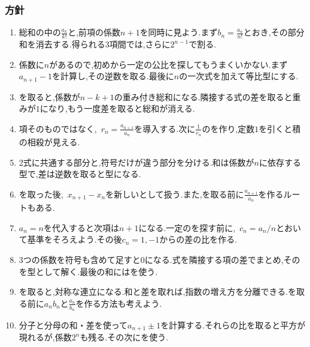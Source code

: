       \subsubsection{方針}\label{節：応用難易度：方針}\label{節：高難易度のもの：方針}
        \begin{enumerate}[label=\textbf{問\arabic*.},leftmargin=3.8em,format=\bookitemlink{practice-advanced}{hint}{problem}]
          \item 総和の中の$\displaystyle \frac{a_k}{k!}$と,前項の係数$n+1$を同時に見よう.まず$\displaystyle b_n=\frac{a_n}{n!}$とおき,その部分和を消去する.得られる3項間では,さらに$2^{n-1}$で割る.
          \item 係数に$n$があるので,初めから一定の公比を探してもうまくいかない.まず$a_{n+1}-1$を計算し,その逆数を取る.最後に$n$の一次式を加えて等比型にする.
          \item {}を取ると,係数が$n-k+1$の重み付き総和になる.隣接する式の差を取ると重みが$1$になり,もう一度差を取ると総和が消える.
          \item 項そのものではなく,\, $\displaystyle r_n=\frac{a_{n+1}}{a_n}$を導入する.次に$\displaystyle \frac{1}{r_n}$のを作り,定数$1$を引くと積の相殺が見える.
          \item 2式に共通する部分と,符号だけが違う部分を分ける.和は係数が$n$に依存する型で,差は逆数を取ると型になる.
          \item {}を取った後,\, $x_{n+1}-x_n$を新しいとして扱う.また,を取る前に$\displaystyle \frac{a_{n+1}}{a_n}$を作るルートもある.
          \item $a_n=n$を代入すると次項は$n+1$になる.一定のを探す前に,\, $c_n=a_n/n$とおいて基準をそろえよう.その後$c_n=1,-1$からの差の比を作る.
          \item 3つの係数を符号も含めて足すと$0$になる.式を隣接する項の差でまとめ,そのを型として解く.最後の和にはを使う.
          \item {}を取ると,対称な連立になる.和と差を取れば,指数の増え方を分離できる.を取る前に$a_nb_n$と$\displaystyle \frac{a_n}{b_n}$を作る方法も考えよう.
          \item 分子と分母の和・差を使って$a_{n+1}\pm1$を計算する.それらの比を取ると平方が現れるが,係数$2^n$も残る.その次にを使う.
        \end{enumerate}


